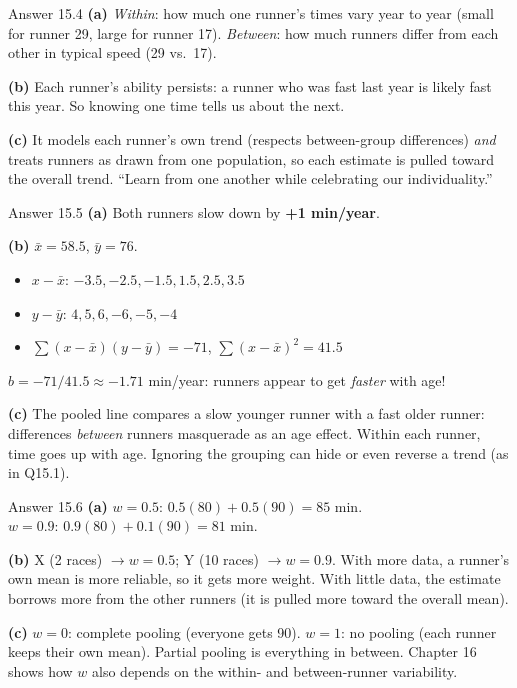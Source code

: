 \documentclass[aspectratio=43,11pt]{beamer}
\begin{document}
\begin{frame}{Answer 15.4}
  \textbf{(a)} \emph{Within}: how much one runner's times vary year to year
  (small for runner 29, large for runner 17). \emph{Between}: how much
  runners differ from each other in typical speed (29 vs.\ 17).
  \vspace{0.4em}

  \textbf{(b)} Each runner's ability persists: a runner who was fast last
  year is likely fast this year. So knowing one time tells us about the
  next.
  \vspace{0.4em}

  \textbf{(c)} It models each runner's own trend (respects between-group
  differences) \emph{and} treats runners as drawn from one population, so
  each estimate is pulled toward the overall trend. ``Learn from one
  another while celebrating our individuality.''
\end{frame}

\begin{frame}{Answer 15.5}
  \textbf{(a)} Both runners slow down by \textbf{+1 min/year}.
  \vspace{0.4em}

  \textbf{(b)} $\bar x = 58.5$, $\bar y = 76$.
  \begin{itemize}
    \item $x - \bar x$: $-3.5, -2.5, -1.5, 1.5, 2.5, 3.5$
    \item $y - \bar y$: $4, 5, 6, -6, -5, -4$
    \item $\sum (x-\bar x)(y-\bar y) = -71$, \quad
      $\sum (x-\bar x)^2 = 41.5$
  \end{itemize}
  $b = -71/41.5 \approx -1.71$ min/year: runners appear to get
  \emph{faster} with age!
  \vspace{0.4em}

  \textbf{(c)} The pooled line compares a slow younger runner with a fast
  older runner: differences \emph{between} runners masquerade as an age
  effect. Within each runner, time goes up with age. Ignoring the grouping
  can hide or even reverse a trend (as in Q15.1).
\end{frame}

\begin{frame}{Answer 15.6}
  \textbf{(a)} $w = 0.5$: $0.5(80) + 0.5(90) = 85$ min. \\
  $w = 0.9$: $0.9(80) + 0.1(90) = 81$ min.
  \vspace{0.4em}

  \textbf{(b)} X (2 races) $\to w = 0.5$; Y (10 races) $\to w = 0.9$.
  With more data, a runner's own mean is more reliable, so it gets more
  weight. With little data, the estimate borrows more from the other
  runners (it is pulled more toward the overall mean).
  \vspace{0.4em}

  \textbf{(c)} $w = 0$: complete pooling (everyone gets 90). $w = 1$: no
  pooling (each runner keeps their own mean). Partial pooling is
  everything in between. Chapter 16 shows how $w$ also depends on the
  within- and between-runner variability.
\end{frame}
\end{document}
